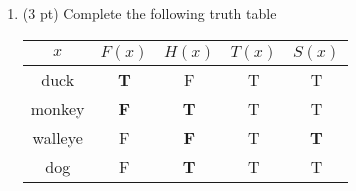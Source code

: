 \begin{questions}
\begin{enumerate}[label=(\alph*)]
  \item (3 pt) Complete the following truth table

\ifprintanswers
	\begin{tabular}{|c|c|c|c|c|}
        \hline
          $x$ & $F(x)$ & $H(x)$ & $T(x)$ & \hspace*{0.15in} $S(x)$ \hspace*{0.15in} \\
        \hline
          duck  & \textbf{T} & F & T & T \\
        \hline
          monkey & \textbf{F} & \textbf{T} & T & T \\
        \hline
           walleye & F & \textbf{F} & T & \textbf{T} \\
        \hline 
           dog   & F & \textbf{T} & T & T \\
        \hline
      \end{tabular}
\else 


\end{enumerate}
\end{questions}
